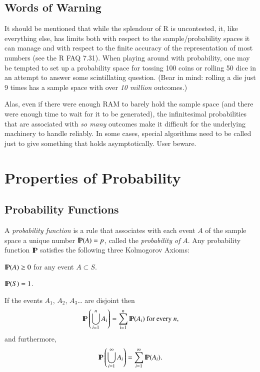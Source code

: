 \documentclass[captions=tableheading]{scrbook}
\begin{document}
\subsection{Words of Warning}
\label{sec-4-3-5}


It should be mentioned that while the splendour of \textsf{R} is uncontested,  it, like everything else, has limits both with respect to the sample/probability spaces it can manage and with respect to the finite accuracy of the representation of most numbers (see the \textsf{R} FAQ 7.31). When playing around with probability, one may be tempted to set up a probability space for tossing 100 coins or rolling 50 dice in an attempt to answer some scintillating question. (Bear in mind: rolling a die just 9 times has a sample space with over \emph{10 million} outcomes.)

Alas, even if there were enough RAM to barely hold the sample space (and there were enough time to wait for it to be generated), the infinitesimal probabilities that are associated with \emph{so many} outcomes make it difficult for the underlying machinery to handle reliably. In some cases, special algorithms need to be called just to give something
that holds asymptotically. User beware.
\section{Properties of Probability}
\label{sec-4-4}

\label{sec:Properties-of-Probability}
\subsection{Probability Functions}
\label{sec-4-4-1}

\label{sub:Probability-Functions}

A \emph{probability function} is a rule that associates with each event \(A\) of the sample space a unique number \(\P(A)=p\), called the \emph{probability of} \(A\). Any probability function \(\P\) satisfies the following three Kolmogorov Axioms: 

\begin{ax}
\label{ax:prob-nonnegative}
\(\P(A)\geq0\) for any event \(A\subset S\).
\end{ax}

\begin{ax}
\label{ax:total-mass-one}
\(\P(S)=1\).
\end{ax}

\begin{ax}
\label{ax:countable-additivity}
If the events \(A_{1}\), \(A_{2}\), \(A_{3}\)\ldots{} are disjoint then
\begin{equation}
\P\left(\bigcup_{i=1}^{n}A_{i}\right)=\sum_{i=1}^{n}\P(A_{i})\mbox{ for every }n,
\end{equation}
and furthermore,
\begin{equation}
\P\left(\bigcup_{i=1}^{\infty}A_{i}\right)=\sum_{i=1}^{\infty}\P(A_{i}).
\end{equation}
\end{ax}
\end{document}
